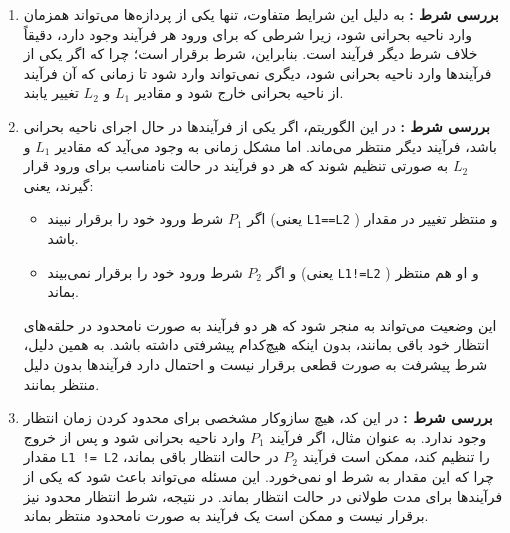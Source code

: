 \begin{qsolve}
	\begin{enumerate}
		\item 
		\textbf{بررسی شرط :}
		به دلیل این شرایط متفاوت، تنها یکی از پردازه‌ها می‌تواند همزمان وارد ناحیه بحرانی شود، زیرا شرطی که برای ورود هر فرآیند وجود دارد، دقیقاً خلاف شرط دیگر فرآیند است. بنابراین، شرط  برقرار است؛ چرا که اگر یکی از فرآیند‌ها وارد ناحیه بحرانی شود، دیگری نمی‌تواند وارد شود تا زمانی که آن فرآیند از ناحیه بحرانی خارج شود و مقادیر $L_1 $ و $L_2 $ تغییر یابند.
		
		
		\item 
		\textbf{بررسی شرط :}
			در این الگوریتم، اگر یکی از فرآیند‌ها در حال اجرای ناحیه بحرانی باشد، فرآیند دیگر منتظر می‌ماند. اما مشکل زمانی به وجود می‌آید که مقادیر $L_1 $ و $L_2 $ به صورتی تنظیم شوند که هر دو فرآیند در حالت نامناسب برای ورود قرار گیرند، یعنی:
		\begin{itemize}
			\item 
			اگر $P_1 $ شرط ورود خود را برقرار نبیند (یعنی \texttt{L1==L2} ) و منتظر تغییر در مقدار باشد.
			
			\item 
			و اگر $P_2 $ شرط ورود خود را برقرار نمی‌بیند (یعنی \texttt{L1!=L2} ) و او هم منتظر بماند.
		\end{itemize}
		
		این وضعیت می‌تواند به  منجر شود که هر دو فرآیند به صورت نامحدود در حلقه‌های انتظار خود باقی بمانند، بدون اینکه هیچ‌کدام پیشرفتی داشته باشد. به همین دلیل، شرط پیشرفت به صورت قطعی برقرار نیست و احتمال دارد فرآیند‌ها بدون دلیل منتظر بمانند.
		
		
		
			\item
			\textbf{بررسی شرط :}
			در این کد، هیچ سازوکار مشخصی برای محدود کردن زمان انتظار وجود ندارد. به عنوان مثال، اگر فرآیند $P_1 $ وارد ناحیه بحرانی شود و پس از خروج مقدار \texttt{L1 != L2} را تنظیم کند، ممکن است فرآیند $P_2 $ در حالت انتظار باقی بماند، چرا که این مقدار به شرط او نمی‌خورد. این مسئله می‌تواند باعث شود که یکی از فرآیند‌ها برای مدت طولانی در حالت انتظار بماند. در نتیجه، شرط انتظار محدود نیز برقرار نیست و ممکن است یک فرآیند به صورت نامحدود منتظر بماند.
		
	\end{enumerate}
\end{qsolve}